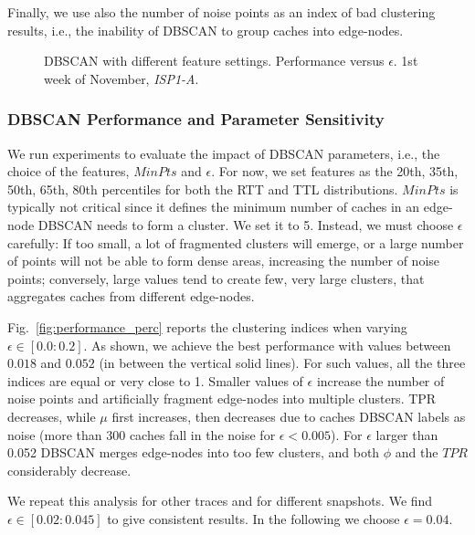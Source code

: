\documentclass{acm_proc_article-sp}
\newcommand{\node}{{edge-node}\xspace}
\newcommand{\nodes}{{edge-nodes}\xspace}
\newcommand{\TApub}{\textit{ISP1-A}\xspace}
\begin{document}
Finally, we use also the number of noise points as an index of bad clustering results, i.e., the inability of DBSCAN to group caches into \nodes.

\begin{figure}[t!]
\caption{DBSCAN with different feature settings. Performance versus $\epsilon$. 1st week of November, \TApub.}
\end{figure}

\subsubsection{DBSCAN Performance and Parameter Sensitivity}

We run experiments to evaluate the impact of DBSCAN parameters, i.e., the choice of the features, $MinPts$ and $\epsilon$.
For now, we set features as the 20th, 35th, 50th, 65th, 80th percentiles for both the RTT and TTL distributions.
$MinPts$ is typically not critical since it defines the minimum number of caches in an \node DBSCAN needs to form a cluster. We set it to 5.
Instead, we must choose $\epsilon$ carefully: If too small, a lot of fragmented clusters will emerge, or a large number of points will not be able to form dense areas, increasing the number of noise points; conversely, large values tend to create few, very large clusters, that aggregates caches from different \nodes.

Fig.~\ref{fig:performance_perc} reports the clustering indices when varying $\epsilon \in [0.0:0.2]$. As shown, we achieve the best performance with values between $0.018$ and $0.052$ (in between the vertical solid lines). For such values, all the three indices are equal or very close to 1.
Smaller values of $\epsilon$ increase the number of noise points and artificially fragment \nodes into multiple clusters. TPR decreases, while $\mu$ first increases, then decreases due to caches DBSCAN labels as noise (more than 300 caches fall in the noise for $\epsilon<0.005$).
For $\epsilon$ larger than 0.052 DBSCAN merges \nodes into too few clusters, and both $\phi$ and the $TPR$ considerably decrease.

We repeat this analysis for other traces and for different snapshots. We find $\epsilon \in [0.02:0.045]$ to give consistent results. In the following we choose $\epsilon=0.04$.
\end{document}
